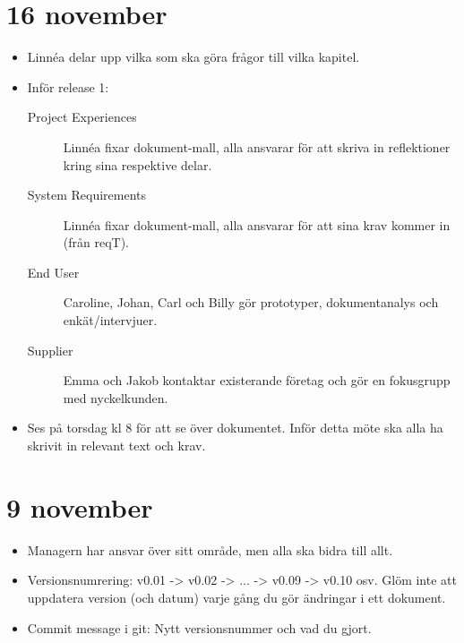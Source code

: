 \documentclass[10pt,a4paper]{article}
\begin{document}
\section*{16 november}
\begin{itemize}
\item Linnéa delar upp vilka som ska göra frågor till vilka kapitel.
\item Inför release 1:
\begin{description}
\item[Project Experiences] Linnéa fixar dokument-mall, alla ansvarar för att skriva in reflektioner kring sina respektive delar.
\item[System Requirements] Linnéa fixar dokument-mall, alla ansvarar för att sina krav kommer in (från reqT).
\item[End User] Caroline, Johan, Carl och Billy gör prototyper, dokumentanalys och enkät/intervjuer.
\item[Supplier] Emma och Jakob kontaktar existerande företag och gör en fokusgrupp med nyckelkunden.
\end{description}
\item Ses på torsdag kl 8 för att se över dokumentet. Inför detta möte ska alla ha skrivit in relevant text och krav.
\end{itemize}

\section*{9 november}
\begin{itemize}
\item Managern har ansvar över sitt område, men alla ska bidra till allt.
\item Versionsnumrering: v0.01 -> v0.02 -> ... -> v0.09 -> v0.10 osv. Glöm inte att uppdatera version (och datum) varje gång du gör ändringar i ett dokument.
\item Commit message i git: Nytt versionsnummer och vad du gjort.
\end{itemize}
\end{document}
